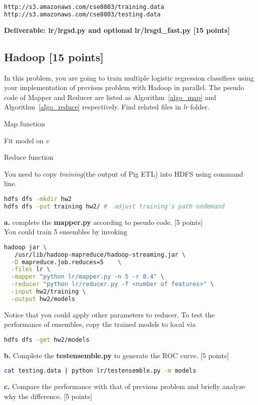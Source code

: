 \documentclass[12pt]{article}
\begin{document}
\begin{lstlisting}[frame=single,language=bash]
http://s3.amazonaws.com/cse8803/training.data 
http://s3.amazonaws.com/cse8803/testing.data
\end{lstlisting}



\textbf{Deliverable: lr/lrgsd.py and optional lr/lrsgd\_fast.py [15 points]}

\subsection{Hadoop [15 points]}
In this problem, you are going to train multiple logistic regression classifiers using your implementation of previous problem with Hadoop in parallel. The pseudo code of Mapper and Reducer are listed as Algorithm~\ref{algo_map} and Algorithm~\ref{algo_reduce} respectively. Find related files in \textit{lr} folder.

\begin{algorithm}
\BlankLine
{}
\caption{Map function}\label{algo_map}
\end{algorithm}

\begin{algorithm}
Fit model on $v$\;
\caption{Reduce function}\label{algo_reduce}
\end{algorithm}
You need to copy \textit{training}(the output of Pig ETL) into HDFS using command line.
\begin{lstlisting}[language=bash,frame=single]
hdfs dfs -mkdir hw2
hdfs dfs -put training hw2/ #  adjust training's path ondemand
\end{lstlisting}
\textbf{a.} complete the \textbf{mapper.py} according to pseudo code. [5 points]\\
You could train 5 ensembles by invoking
\begin{lstlisting}[language=bash,frame=single]
hadoop jar \
   /usr/lib/hadoop-mapreduce/hadoop-streaming.jar \
  -D mapreduce.job.reduces=5    \
  -files lr \
  -mapper "python lr/mapper.py -n 5 -r 0.4" \
  -reducer "python lr/reducer.py -f <number of features>" \
  -input hw2/training \
  -output hw2/models
\end{lstlisting}
Notice that you could apply other parameters to reducer. To test the performance of ensembles, copy the trained models to local via
\begin{lstlisting}[language=bash,frame=single]
hdfs dfs -get hw2/models
\end{lstlisting}
\textbf{b.} Complete the \textbf{testensemble.py} to generate the ROC curve. [5 points]
\begin{lstlisting}[language=bash,frame=single]
cat testing.data | python lr/testensemble.py -m models
\end{lstlisting}
\textbf{c.} Compare the performance with that of previous problem and briefly analyze why the difference. [5 points]
\end{document}
